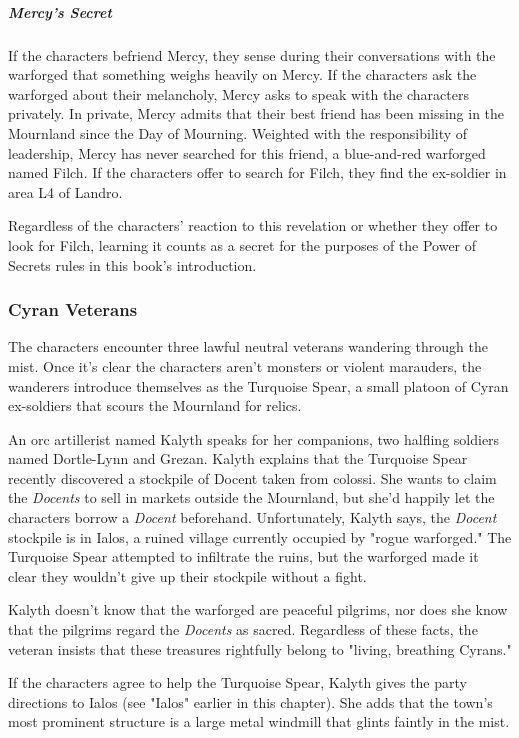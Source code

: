 \documentclass[10pt,a4paper,twoside,bg=print,twocolumn,openany,nodeprecatedcode]{dndbook}
\begin{document}
\subparagraph{Mercy's Secret}
If the characters befriend Mercy, they sense during their conversations with the warforged that something weighs heavily on Mercy. If the characters ask the warforged about their melancholy, Mercy asks to speak with the characters privately. In private, Mercy admits that their best friend has been missing in the Mournland since the Day of Mourning. Weighted with the responsibility of leadership, Mercy has never searched for this friend, a blue-and-red warforged named Filch. If the characters offer to search for Filch, they find the ex-soldier in area L4 of Landro.

Regardless of the characters' reaction to this revelation or whether they offer to look for Filch, learning it counts as a secret for the purposes of the Power of Secrets rules in this book's introduction.

\subsubsection{Cyran Veterans}
The characters encounter three lawful neutral veterans wandering through the mist. Once it's clear the characters aren't monsters or violent marauders, the wanderers introduce themselves as the Turquoise Spear, a small platoon of Cyran ex-soldiers that scours the Mournland for relics.

An orc artillerist named Kalyth speaks for her companions, two halfling soldiers named Dortle-Lynn and Grezan. Kalyth explains that the Turquoise Spear recently discovered a stockpile of Docent taken from colossi. She wants to claim the \textit{Docents} to sell in markets outside the Mournland, but she'd happily let the characters borrow a \textit{Docent} beforehand. Unfortunately, Kalyth says, the \textit{Docent} stockpile is in Ialos, a ruined village currently occupied by "rogue warforged." The Turquoise Spear attempted to infiltrate the ruins, but the warforged made it clear they wouldn't give up their stockpile without a fight.

Kalyth doesn't know that the warforged are peaceful pilgrims, nor does she know that the pilgrims regard the \textit{Docents} as sacred. Regardless of these facts, the veteran insists that these treasures rightfully belong to "living, breathing Cyrans."

If the characters agree to help the Turquoise Spear, Kalyth gives the party directions to Ialos (see "Ialos" earlier in this chapter). She adds that the town's most prominent structure is a large metal windmill that glints faintly in the mist.
\end{document}
